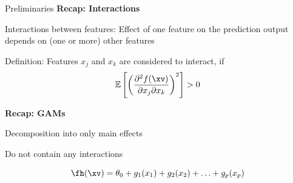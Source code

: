 \documentclass[10pt,compress,t,notes=noshow, xcolor=table]{beamer}
\begin{document}



\begin{framev}[align=top]{Preliminaries}
\textbf{Recap: Interactions}
\begin{itemizeM}
\item Interactions between features: Effect of one feature on the prediction output depends on (one or more) other features
\item Definition: Features $x_j$ and $x_k$ are considered to interact, if
$$
\mathbb{E} \left[ \left( \frac{\partial^2 f(\xv)}{\partial x_j \partial x_k} \right)^2 \right] > 0
$$
\end{itemizeM}
\pause
\textbf{Recap: GAMs}
\begin{itemizeM}
\item Decomposition into only main effects
\item Do not contain any interactions
\end{itemizeM}
$$
\fh (\xv) = \theta_0 + g_1(x_1) + g_2(x_2) + \ldots + g_p(x_p)
$$



\end{framev}
\end{document}
